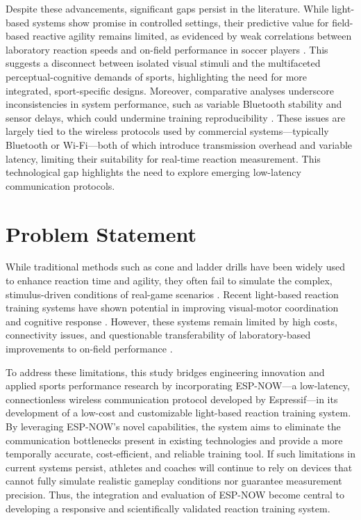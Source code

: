 	Despite these advancements, significant gaps persist in the literature. While light-based systems show promise in controlled settings, their predictive value for field-based reactive agility remains limited, as evidenced by weak correlations between laboratory reaction speeds and on-field performance in soccer players \parencite{Broodryk:2025:LBR}. This suggests a disconnect between isolated visual stimuli and the multifaceted perceptual-cognitive demands of sports, highlighting the need for more integrated, sport-specific designs. Moreover, comparative analyses underscore inconsistencies in system performance, such as variable Bluetooth stability and sensor delays, which could undermine training reproducibility \parencite{Ezhov:2021:MLS}. These issues are largely tied to the wireless protocols used by commercial systems—typically Bluetooth or Wi-Fi—both of which introduce transmission overhead and variable latency, limiting their suitability for real-time reaction measurement. This technological gap highlights the need to explore emerging low-latency communication protocols.


\section{Problem Statement}

	While traditional methods such as cone and ladder drills have been widely used to enhance reaction time and agility, they often fail to simulate the complex, stimulus-driven conditions of real-game scenarios \parencite{Hassan:2023:ESF}. Recent light-based reaction training systems have shown potential in improving visual-motor coordination and cognitive response \parencite{Horvath:2022:ARA, Jothi:2025:EVT}. However, these systems remain limited by high costs, connectivity issues, and questionable transferability of laboratory-based improvements to on-field performance \parencite{Broodryk:2025:LBR, Ezhov:2021:MLS}.
	
	To address these limitations, this study bridges engineering innovation and applied sports performance research by incorporating ESP-NOW—a low-latency, connectionless wireless communication protocol developed by Espressif—in its development of a low-cost and customizable light-based reaction training system. By leveraging ESP-NOW’s novel capabilities, the system aims to eliminate the communication bottlenecks present in existing technologies and provide a more temporally accurate, cost-efficient, and reliable training tool. If such limitations in current systems persist, athletes and coaches will continue to rely on devices that cannot fully simulate realistic gameplay conditions nor guarantee measurement precision. Thus, the integration and evaluation of ESP-NOW become central to developing a responsive and scientifically validated reaction training system.


